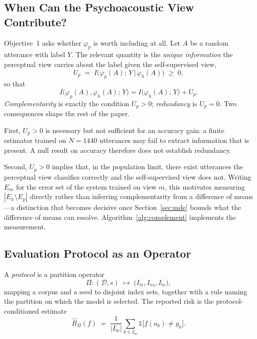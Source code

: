 \documentclass[journal,onecolumn,11pt,draftclsnofoot]{IEEEtran}   %
\begin{document}
\subsection{When Can the Psychoacoustic View Contribute?}
\label{sec:whencontrib}
Objective~1 asks whether $\varphi_p$ is worth including at all. Let $A$ be a
random utterance with label $Y$. The relevant quantity is the \emph{unique
information} the perceptual view carries about the label given the
self-supervised view,
\begin{equation}
  U_p \;=\; I\big(\varphi_p(A);\, Y \,\big|\, \varphi_h(A)\big) \;\geq\; 0 ,
  \label{eq:unique}
\end{equation}
so that
\begin{equation}
  I\big(\varphi_p(A), \varphi_h(A);\, Y\big)
  = I\big(\varphi_h(A);\, Y\big) + U_p .
  \label{eq:chain}
\end{equation}
\emph{Complementarity} is exactly the condition $U_p > 0$; \emph{redundancy} is
$U_p = 0$. Two consequences shape the rest of the paper.

First, $U_p > 0$ is necessary but not sufficient for an accuracy gain: a finite
estimator trained on $N = 1440$ utterances may fail to extract information that
is present. A null result on accuracy therefore does not establish redundancy.

Second, $U_p > 0$ implies that, in the population limit, there exist utterances
the perceptual view classifies correctly and the self-supervised view does not.
Writing $E_m$ for the error set of the system trained on view $m$, this
motivates measuring $|E_h \setminus E_p|$ directly rather than inferring
complementarity from a difference of means---a distinction that becomes decisive
once Section~\ref{sec:mde} bounds what the difference of means can resolve.
Algorithm~\ref{alg:complement} implements the measurement.

\subsection{Evaluation Protocol as an Operator}
A \emph{protocol} is a partition operator
\begin{equation}
  \Pi : (\mathcal{D}, s) \;\longmapsto\;
  \big(I_{\mathrm{tr}}, I_{\mathrm{va}}, I_{\mathrm{te}}\big),
  \label{eq:protocol}
\end{equation}
mapping a corpus and a seed to disjoint index sets, together with a rule
naming the partition on which the model is selected. The reported risk is the
protocol-conditioned estimate
\begin{equation}
  \widehat{R}_\Pi(f) \;=\; \frac{1}{|I_{\mathrm{te}}|}
  \sum_{k \in I_{\mathrm{te}}} \mathbb{1}\big[f(a_k) \neq y_k\big].
  \label{eq:risk-hat}
\end{equation}
\end{document}
